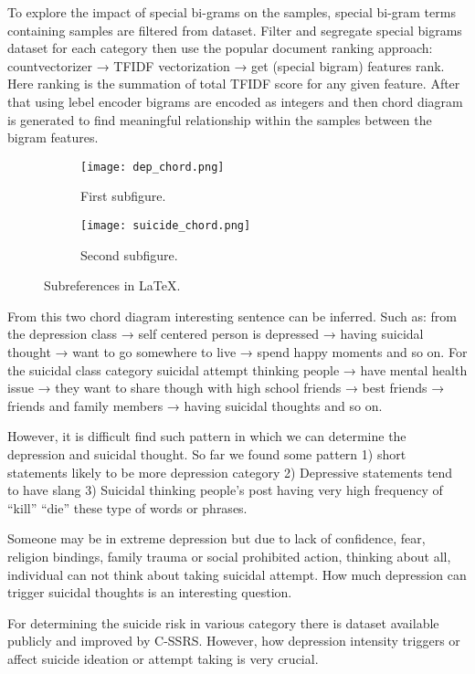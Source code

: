 \documentclass[12pt, letterpaper]{article}
\begin{document}
To explore the impact of special bi-grams on the samples, special bi-gram terms containing samples are filtered from dataset. Filter and segregate special bigrams dataset for each category then use the popular document ranking approach: countvectorizer → TFIDF vectorization → get (special bigram) features rank. Here ranking is the summation of total TFIDF score for any given feature. 
After that using lebel encoder bigrams are encoded as integers and then chord diagram is generated to find meaningful relationship within the samples between the bigram features.  


\begin{figure}[H]
\centering
\begin{subfigure}{0.8\textwidth}
    \texttt{[image: dep\_chord.png]}
    \caption{First subfigure.}
    \label{fig:first}
\end{subfigure}
\hfill
\begin{subfigure}{0.8\textwidth}
    \texttt{[image: suicide\_chord.png]}
    \caption{Second subfigure.}
    \label{fig:second}
\end{subfigure}
        
\caption{Subreferences in \LaTeX.}
\label{fig:figures}
\end{figure}


From this two chord diagram interesting sentence can be inferred. Such as: from the depression class → self centered person is depressed → having suicidal thought → want to go somewhere to live → spend happy moments and so on. For the suicidal class category suicidal attempt thinking people → have mental health issue → they want to share though with high school friends → best friends → friends and family members → having suicidal thoughts and so on.  

However, it is difficult find such pattern in which we can determine the depression and suicidal thought. So far we found some pattern 1) short statements likely to be more depression category
2) Depressive statements tend to have slang
3) Suicidal thinking people’s post having very high frequency of “kill” “die” these type of words or phrases.

Someone may be in extreme depression but due to lack of confidence, fear, religion bindings, family trauma or social prohibited action, thinking about all, individual can not think about taking suicidal attempt. How much depression can trigger suicidal thoughts is an interesting question. 

For determining the suicide risk in various category there is dataset available publicly and improved by C-SSRS. However, how depression intensity triggers or affect suicide ideation or attempt taking is very crucial. 
\end{document}
